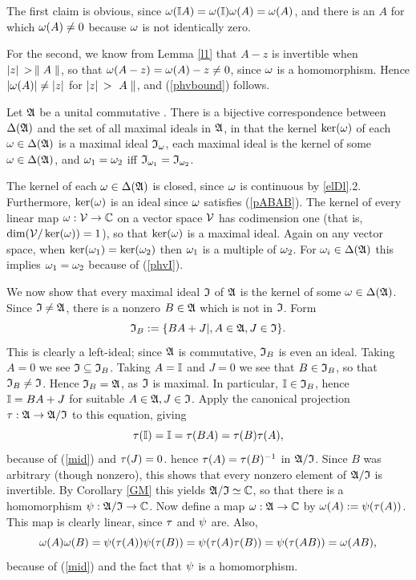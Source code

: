 The first claim is obvious, since $\omega({\Bbb I} A)=\omega({\Bbb I})\omega(A)=\omega(A)$,
and there is an $A$ for which $\omega(A)\neq 0$ because $\omega$ is not
identically zero.

For the second, we know from Lemma \ref{l1} that $A-z$ is invertible
when $|z|\,>\,\parallel A\parallel$, so that $\omega(A-z)=\omega(A)-z\neq 0$, since $\omega$
is a homomorphism.  Hence $|\omega(A)|\neq|z|$ for $|z|\,>\,\, A\parallel$, and
(\ref{phvbound}) follows.  \enp
\begin{Theorem}
Let ${\frak A}$ be a unital commutative \BA.  There is a bijective
correspondence between $\Delta({\frak A})$ and the set of all maximal ideals in
${\frak A}$, in that the kernel $\ker(\omega)$ of each $\omega\in\Delta({\frak A})$ is a maximal
ideal ${\frak I}_{\omega}$, each maximal ideal is the kernel of some
$\omega\in\Delta({\frak A})$, and $\omega_1=\omega_2$ iff
${\frak I}_{\omega_1}={\frak I}_{\omega_2}$. \end{Theorem}

The kernel of each $\omega\in\Delta({\frak A})$ is closed, since $\omega$ is continuous by
\ref{elDl}.2. Furthermore, $\ker(\omega)$ is an ideal since $\omega$
satisfies (\ref{pABAB}). The kernel of every linear map
$\omega:{\cal V}\rightarrow{\Bbb C}$ on a vector space ${\cal V}$ has codimension one (that is,
$\dim({\cal V}/\ker(\omega))=1$), so that $\ker(\omega)$ is a maximal ideal.
Again on any vector space, when $\ker(\omega_1)=\ker(\omega_2)$ then $\omega_1$
is a multiple of $\omega_2$. For $\omega_i\in\Delta({\frak A})$ this implies $\omega_1=\omega_2$
because of (\ref{phvI}).

We now show that every maximal ideal ${\frak I}$ of ${\frak A}$ is the kernel of
some $\omega\in\Delta({\frak A})$. Since ${\frak I}\neq{\frak A}$, there is a nonzero $B\in{\frak A}$ which
is not in ${\frak I}$. Form
$$
{\frak I}_B:=\{BA+J|, A\in{\frak A},J\in{\frak I}\}.
$$ 
This is clearly a left-ideal; since ${\frak A}$ is commutative, ${\frak I}_B$ is
even an ideal. Taking $A=0$ we see ${\frak I}\subseteq{\frak I}_B$. Taking $A={\Bbb I}$
and $J=0$ we see that $B\in{\frak I}_B$, so that ${\frak I}_B\neq{\frak I}$. Hence
${\frak I}_B={\frak A}$, as ${\frak I}$ is maximal. In particular, ${\Bbb I}\in{\frak I}_B$, hence
${\Bbb I}=BA+J$ for suitable $A\in{\frak A},J\in{\frak I}$. Apply the canonical
projection $\tau:{\frak A}\rightarrow{\frak A}/{\frak I}$ to this equation, giving
$$
\tau({\Bbb I})={\Bbb I}=\tau(BA)=\tau(B)\tau(A),$$ because of (\ref{mid}) and
$\tau(J)=0$. hence $\tau(A)=\tau(B)^{-1}$ in ${\frak A}/{\frak I}$. Since $B$ was
arbitrary (though nonzero), this shows that every nonzero element of
${\frak A}/{\frak I}$ is invertible. By Corollary \ref{GM} this yields
${\frak A}/{\frak I}\simeq{\Bbb C}$, so that there is a homomorphism $\psi:{\frak A}/{\frak I}\rightarrow{\Bbb C}$.
Now define a map $\omega:{\frak A}\rightarrow{\Bbb C}$ by $\omega(A):=\psi(\tau(A))$. This map is
clearly linear, since $\tau$ and $\psi$ are. Also,
$$
\omega(A)\omega(B)= \psi(\tau(A))\psi(\tau(B))=\psi(\tau(A)\tau(B))=\psi(\tau(AB))=
\omega(AB),$$ because of (\ref{mid}) and the fact that $\psi$ is a
homomorphism.

